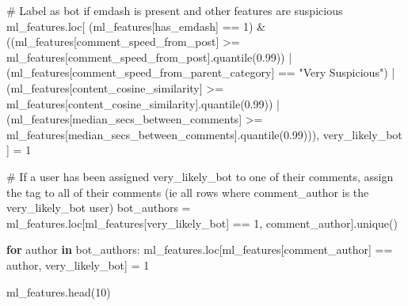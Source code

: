 \documentclass[
  12pt,
  letterpaper,
  DIV=11,
  numbers=noendperiod]{scrartcl}
\newenvironment{Shaded}{\begin{snugshade}}{\end{snugshade}}
\newcommand{\CommentTok}[1]{\textcolor[rgb]{0.37,0.37,0.37}{#1}}
\newcommand{\ControlFlowTok}[1]{\textcolor[rgb]{0.00,0.23,0.31}{\textbf{#1}}}
\newcommand{\DecValTok}[1]{\textcolor[rgb]{0.68,0.00,0.00}{#1}}
\newcommand{\FloatTok}[1]{\textcolor[rgb]{0.68,0.00,0.00}{#1}}
\newcommand{\KeywordTok}[1]{\textcolor[rgb]{0.00,0.23,0.31}{\textbf{#1}}}
\newcommand{\NormalTok}[1]{\textcolor[rgb]{0.00,0.23,0.31}{#1}}
\newcommand{\OperatorTok}[1]{\textcolor[rgb]{0.37,0.37,0.37}{#1}}
\newcommand{\StringTok}[1]{\textcolor[rgb]{0.13,0.47,0.30}{#1}}
\begin{document}
\begin{Shaded}
\begin{Highlighting}[]
\CommentTok{\# Label as bot if emdash is present and other features are suspicious}
\NormalTok{ml\_features.loc[}
\NormalTok{    (ml\_features[}\StringTok{\textquotesingle{}has\_emdash\textquotesingle{}}\NormalTok{] }\OperatorTok{==} \DecValTok{1}\NormalTok{) }\OperatorTok{\&}
\NormalTok{    ((ml\_features[}\StringTok{\textquotesingle{}comment\_speed\_from\_post\textquotesingle{}}\NormalTok{] }\OperatorTok{\textgreater{}=}\NormalTok{ ml\_features[}\StringTok{\textquotesingle{}comment\_speed\_from\_post\textquotesingle{}}\NormalTok{].quantile(}\FloatTok{0.99}\NormalTok{)) }\OperatorTok{|}
\NormalTok{     (ml\_features[}\StringTok{\textquotesingle{}comment\_speed\_from\_parent\_category\textquotesingle{}}\NormalTok{] }\OperatorTok{==} \StringTok{"Very Suspicious"}\NormalTok{) }\OperatorTok{|}
\NormalTok{     (ml\_features[}\StringTok{\textquotesingle{}content\_cosine\_similarity\textquotesingle{}}\NormalTok{] }\OperatorTok{\textgreater{}=}\NormalTok{ ml\_features[}\StringTok{\textquotesingle{}content\_cosine\_similarity\textquotesingle{}}\NormalTok{].quantile(}\FloatTok{0.99}\NormalTok{)) }\OperatorTok{|}
\NormalTok{     (ml\_features[}\StringTok{\textquotesingle{}median\_secs\_between\_comments\textquotesingle{}}\NormalTok{] }\OperatorTok{\textgreater{}=}\NormalTok{ ml\_features[}\StringTok{\textquotesingle{}median\_secs\_between\_comments\textquotesingle{}}\NormalTok{].quantile(}\FloatTok{0.99}\NormalTok{))),}
    \StringTok{\textquotesingle{}very\_likely\_bot\textquotesingle{}}
\NormalTok{] }\OperatorTok{=} \DecValTok{1}

\CommentTok{\# If a user has been assigned very\_likely\_bot to one of their comments, assign the tag to all of their comments (ie all rows where comment\_author is the very\_likely\_bot user)}
\NormalTok{bot\_authors }\OperatorTok{=}\NormalTok{ ml\_features.loc[ml\_features[}\StringTok{\textquotesingle{}very\_likely\_bot\textquotesingle{}}\NormalTok{] }\OperatorTok{==} \DecValTok{1}\NormalTok{, }\StringTok{\textquotesingle{}comment\_author\textquotesingle{}}\NormalTok{].unique()}

\ControlFlowTok{for}\NormalTok{ author }\KeywordTok{in}\NormalTok{ bot\_authors:}
\NormalTok{    ml\_features.loc[ml\_features[}\StringTok{\textquotesingle{}comment\_author\textquotesingle{}}\NormalTok{] }\OperatorTok{==}\NormalTok{ author, }\StringTok{\textquotesingle{}very\_likely\_bot\textquotesingle{}}\NormalTok{] }\OperatorTok{=} \DecValTok{1}

\NormalTok{ml\_features.head(}\DecValTok{10}\NormalTok{)}
\end{Highlighting}
\end{Shaded}
\end{document}
